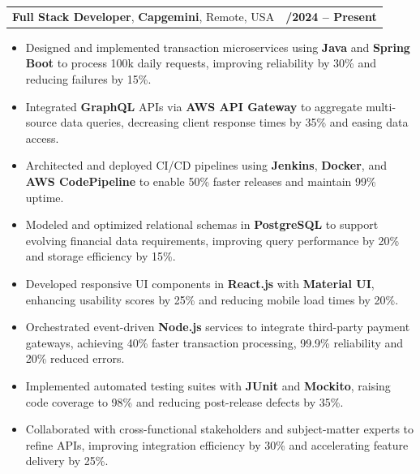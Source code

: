 \documentclass[letterpaper,11pt]{article}
\makeatletter
\newcommand{\resumeItem}[1]{
  \item\footnotesize{
    {#1 \vspace{-2pt}}
  }
}
\newcommand{\resumeSubheading}[4]{
  \vspace{-2pt}\item
    \begin{tabular*}{1.0\textwidth}[t]{l@{\extracolsep{\fill}}r}
      \textbf{\fontsize{10pt}{14pt}\selectfont #3}, \textbf{\fontsize{10pt}{14pt}\selectfont #1}, \fontsize{10pt}{14pt}\selectfont #4 & \textbf{\fontsize{10pt}{14pt}\selectfont #2} \\
    \end{tabular*}\vspace{-7pt}
}
\newcommand{\resumeItemListStart}{\begin{itemize}[leftmargin=*]}
\newcommand{\resumeItemListEnd}{\end{itemize}\vspace{-5pt}}
\makeatother
\begin{document}
    \resumeSubheading
        {Capgemini}{01/2024 -- Present}
        {Full Stack Developer}{Remote, USA}
      \resumeItemListStart
        \resumeItem{Designed and implemented transaction microservices using \textbf{Java} and \textbf{Spring Boot} to process 100k daily requests, improving reliability by 30\% and reducing failures by 15\%.}
        \resumeItem{Integrated \textbf{GraphQL} APIs via \textbf{AWS API Gateway} to aggregate multi-source data queries, decreasing client response times by 35\% and easing data access.}
        \resumeItem{Architected and deployed CI/CD pipelines using \textbf{Jenkins}, \textbf{Docker}, and \textbf{AWS CodePipeline} to enable 50\% faster releases and maintain 99\% uptime.}
        \resumeItem{Modeled and optimized relational schemas in \textbf{PostgreSQL} to support evolving financial data requirements, improving query performance by 20\% and storage efficiency by 15\%.}
        \resumeItem{Developed responsive UI components in \textbf{React.js} with \textbf{Material UI}, enhancing usability scores by 25\% and reducing mobile load times by 20\%.}
        \resumeItem{Orchestrated event-driven \textbf{Node.js} services to integrate third-party payment gateways, achieving 40\% faster transaction processing, 99.9\% reliability and 20\% reduced errors.}
        \resumeItem{Implemented automated testing suites with \textbf{JUnit} and \textbf{Mockito}, raising code coverage to 98\% and reducing post-release defects by 35\%.}
        \resumeItem{Collaborated with cross-functional stakeholders and subject-matter experts to refine APIs, improving integration efficiency by 30\% and accelerating feature delivery by 25\%.}
      \resumeItemListEnd
\end{document}
